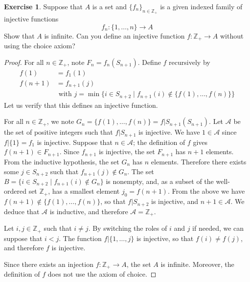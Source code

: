 \documentclass[11pt,a4paper,twoside]{article}
\theoremstyle{definition}
\newcounter{excounter}
\newtheorem{exercise}[excounter]{Exercise}
\begin{document}
\begin{exercise}

  Suppose that $A$ is a set and $\{ f_n \}_{n \in \mathbb{Z}_+}$ is a given indexed family of injective functions
  \begin{equation*}
    f_n : \{ 1, \dotsc, n \} \to A
  \end{equation*}
  Show that $A$ is infinite. Can you define an injective function $f : \mathbb{Z}_+ \to A$ without using the choice axiom?

\end{exercise}

\begin{proof}

  For all $n \in \mathbb{Z}_+$, note $F_n = f_n ( S_{n + 1} )$.
  Define $f$ recursively by
  \begin{align*}
    f (1) &= f_1 (1) \\
    f (n + 1) &= f_{n + 1} (j) \\
    &\text{ with } j = \min \big\{ i \in S_{n + 2} \mid f_{n + 1} (i) \notin \{ f (1), \dotsc, f (n) \} \big\}
  \end{align*}
  Let us verify that this defines an injective function.

  For all $n \in \mathbb{Z}_+$, we note $G_n = \{ f (1), \dotsc, f (n) \} = f | S_{n + 1} ( S_{n + 1} )$.
  Let $\mathscr{A}$ be the set of positive integers such that $f | S_{n + 1}$ is injective.
  We have $1 \in \mathscr{A}$ since $f | \{ 1 \} = f_1$ is injective.
  Suppose that $n \in \mathscr{A}$; the definition of $f$ gives $f (n + 1) \in F_{n + 1}$.
  Since $f_{n + 1}$ is injective, the set $F_{n + 1}$ has $n + 1$ elements. From the inductive hypothesis, the set $G_n$ has
  $n$ elements. Therefore there exists some $j \in S_{n + 2}$ such that $f_{n + 1} (j) \notin G_n$.
  The set $B = \{ i \in S_{n + 2} \mid f_{n + 1} (i) \notin G_n \}$ is nonempty, and, as a subset of the well-ordered set $\mathbb{Z}_+$,
  has a smallest element $j_0 = f (n + 1)$. From the above we have $f (n + 1) \notin \{ f (1), \dotsc, f (n) \}$, so that $f | S_{n + 2}$ is injective,
  and $n + 1 \in \mathscr{A}$.
  We deduce that $\mathscr{A}$ is inductive, and therefore $\mathscr{A} = \mathbb{Z}_+$.

  Let $i, j \in \mathbb{Z}_+$ such that $i \neq j$. By switching the roles of $i$ and $j$ if needed, we can suppose that $i < j$.
  The function $f|\{ 1, \dotsc, j \}$ is injective, so that $f (i) \neq f (j)$, and therefore $f$ is injective.

  Since there exists an injection $f : \mathbb{Z}_+ \to A$, the set $A$ is infinite.
  Moreover, the definition of $f$ does not use the axiom of choice.

\end{proof}
\end{document}
